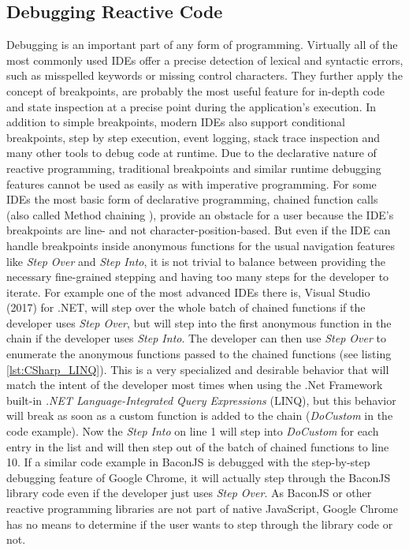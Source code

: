 \subsection{Debugging Reactive Code}
Debugging is an important part of any form of programming. Virtually all of the most commonly used IDEs offer a precise detection of lexical and syntactic errors, such as misspelled keywords or missing control characters. They further apply the concept of breakpoints, are probably the most useful feature for in-depth code and state inspection at a precise point during the application's execution. In addition to simple breakpoints, modern IDEs also support conditional breakpoints, step by step execution, event logging, stack trace inspection and many other tools to debug code at runtime. Due to the declarative nature of  reactive programming, traditional breakpoints and similar runtime debugging features cannot be used as easily as with imperative programming. For some IDEs the most basic form of declarative programming, chained function calls (also called Method chaining \cite{MethodChaining}), provide an obstacle for a user because the IDE's breakpoints are line- and not character-position-based. But even if the IDE can handle breakpoints inside anonymous functions for the usual navigation features like \emph{Step Over} and \emph{Step Into}, it is not trivial to balance between providing the necessary fine-grained stepping and having too many steps for the developer to iterate. For example one of the most advanced IDEs there is, Visual Studio (2017) for .NET, will step over the whole batch of chained functions if the developer uses \emph{Step Over}, but will step into the first anonymous function in the chain if the developer uses \emph{Step Into}. The developer can then use \emph{Step Over} to enumerate the anonymous functions passed to the chained functions (see listing \ref{lst:CSharp_LINQ}). This is a very specialized and desirable behavior that will match the intent of the developer most times when using the .Net Framework built-in \emph{.NET Language-Integrated Query Expressions} (LINQ), but this behavior will break as soon as a custom function is added to the chain (\emph{DoCustom} in the code example). Now the \emph{Step Into} on line 1 will step into \emph{DoCustom} for each entry in the list and will then step out of the batch of chained functions to line 10. If a similar code example in BaconJS is debugged with the step-by-step debugging feature of Google Chrome, it will actually step through the BaconJS library code even if the developer just uses \emph{Step Over}. As BaconJS or other reactive programming libraries are not part of native JavaScript, Google Chrome has no means to determine if the user wants to step through the library code or not.
